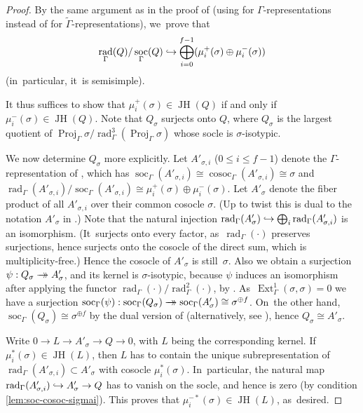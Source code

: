 \documentclass[JEP,XML,SOM,Unicode,NoFloatCountersInSection, NoEqCountersInSection,published]{cedram}
\newcommand\hto{\mathrel{\lhook\joinrel\to}}
\newcommand{\onto}{\mathchoice{\to\hspace*{-5mm}\to}{\mathrel{\hbox{$\to\hspace*{-2.85mm}\to$}}}{\to\hspace*{-3mm}\to}{\to\hspace*{-3mm}\to}}
\let\wt\widetilde
\DeclareMathOperator{\cosoc}{cosoc}
\DeclareMathOperator{\Ext}{Ext}
\DeclareMathOperator{\JH}{\mathrm{JH}}
\DeclareMathOperator{\Proj}{Proj}
\DeclareMathOperator{\rad}{rad}
\DeclareMathOperator{\soc}{soc}
\theoremstyle{plain}
\theoremstyle{definition}
\begin{document}
\begin{proof}
{By the same argument as in the proof of \cite[Cor.\,2.32]{HuWang2} (using \cite[Cor.\,2.3]{HuWang2} for $\Gamma$-representations instead of \cite[Cor.\,2.26]{HuWang2} for $\wt\Gamma$-representations), we~prove that
\[
\rad_\Gamma(Q)/\soc_\Gamma(Q) \hto \bigoplus_{i=0}^{f-1} (\mu_i^+(\sigma) \oplus \mu_i^-(\sigma))
\]
(in~particular, it~is semisimple). }

It thus suffices to show that $\mu_i^+(\sigma) \in \JH(Q)$ if and only if $\mu_i^-(\sigma) \in \JH(Q)$.
Note that $Q_\sigma$ surjects onto $Q$, where $Q_\sigma$ is the largest quotient of $\Proj_\Gamma \sigma/\rad_\Gamma^3(\Proj_\Gamma \sigma)$ whose socle is $\sigma$-isotypic.

We now determine $Q_\sigma$ more explicitly.
Let $A'_{\sigma,i}$ ($0 \le i \le f-1$) denote the $\Gamma$\nobreakdash-representation of \cite[Def.\,2.5]{HuWang}, which has $\soc_\Gamma(A'_{\sigma,i}) \cong \cosoc_\Gamma(A'_{\sigma,i}) \cong \sigma$ and $\rad_\Gamma(A'_{\sigma,i})/\soc_\Gamma(A'_{\sigma,i}) \cong \mu_i^+(\sigma) \oplus \mu_i^-(\sigma)$.
Let $A'_\sigma$ denote the fiber product of all $A'_{\sigma,i}$ over their common cosocle $\sigma$.
(Up to twist this is dual to the notation $A'_\sigma$ in \cite{HuWang}.)
Note that the natural injection $\rad_\Gamma(A'_\sigma) \hto \bigoplus_i \rad_\Gamma(A'_{\sigma,i})$ is an isomorphism.
(It~surjects onto every factor, as~$\rad_\Gamma(\cdot)$ preserves surjections, hence surjects onto the cosocle of the direct sum, which is multiplicity-free.)
Hence the cosocle of $A'_\sigma$ is still~$\sigma$.
Also we obtain a surjection $\psi: Q_\sigma \onto A'_\sigma$, and its kernel is $\sigma$-isotypic, because $\psi$ induces an isomorphism after applying the functor $\rad_\Gamma(\cdot)/\rad^2_\Gamma(\cdot)$, \eg by \cite[Cor.\,5.6(i)]{BP}. As~$\Ext^1_\Gamma(\sigma,\sigma) = 0$ we have a surjection $\soc_\Gamma(\psi): \soc_\Gamma(Q_\sigma) \onto \soc_\Gamma(A'_\sigma) \cong \sigma^{\oplus f}$. On~the other hand, $\soc_\Gamma(Q_\sigma) \cong \sigma^{\oplus f}$ by the dual version of \cite[Prop.\,2.11]{HuWang} (alternatively, see \cite[Th.\,4.3]{AJL}),
hence $Q_\sigma \cong A'_\sigma$.

Write $0 \to L \to A'_\sigma \to Q \to 0$, with $L$ being the corresponding kernel.
If $\mu_i^*(\sigma) \in \JH(L)$, then $L$ has to contain the unique subrepresentation of $\rad_\Gamma(A'_{\sigma,i}) \subset A'_\sigma$ with cosocle $\mu_i^*(\sigma)$. In~particular, the natural map $\rad_\Gamma(A'_{\sigma,i}) \hto A'_\sigma \to Q$ has to vanish on the socle, and hence is zero (by condition \eqref{lem:soc-cosoc-sigmai}).
This proves that $\mu_i^{-*}(\sigma) \in \JH(L)$, as~desired.
\end{proof}
\end{document}
